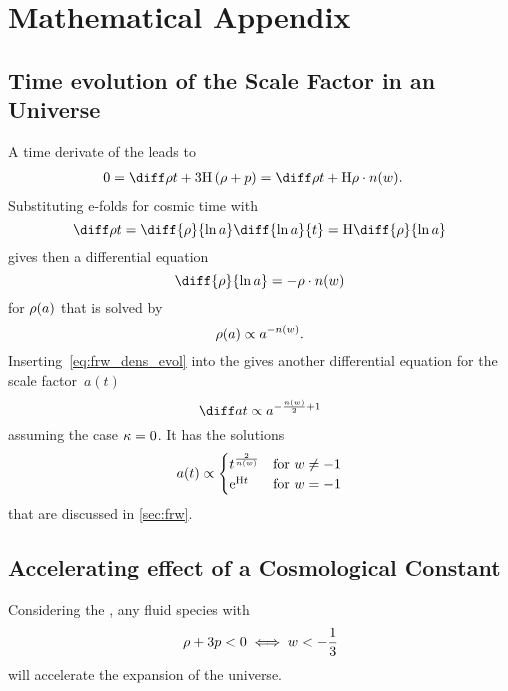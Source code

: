 \chapter{Mathematical Appendix}

\section{Time evolution of the Scale Factor in an \FLRW{} Universe}\label{app:deriv_frw_a_evol}

A time derivate of the  leads to
\begin{align}
	0 &= \dt{\dens} + 3\Hcosm\del{\dens + p} = \dt{\dens} + \Hcosm\dens \cdot \nexp
	\eqpunct{.}
\end{align}
Substituting e-folds for cosmic time with
\begin{equation}
	\dt{\dens} = \diff{\dens}{\efold} \diff{\efold}{t} = \Hcosm \diff{\dens}{\efold}
\end{equation}
gives then a differential equation
\begin{equation}
	\diff{\dens}{\efold} = -\dens \cdot \nexp
\end{equation}
for \(\rho(a)\) that is solved by
\begin{equation}
	\rho(a) \propto a^{-n(w)}
	\mathpunct{.}
\end{equation}
Inserting~\eqref{eq:frw_dens_evol} into the  gives another differential equation for the scale factor~\(a(t)\)
\begin{equation}
	\dt{a} \propto a^{-\frac{\nexp}{2}+1}
\end{equation}
assuming the case \(\kappa=0\). It has the solutions
\begin{equation}
	a(t) \propto
	\begin{cases}
		t^{\frac{2}{n(w)}} &\text{for \(w\neq-1\)} \\
		\mathrm{e}^{\mathrm{H} t} &\text{for \(w=-1\)}
	\end{cases}
\end{equation}
that are discussed in \autoref{sec:frw}.


\section{Accelerating effect of a Cosmological Constant}\label{app:deriv_acc_exp_lambda}

Considering the , any fluid species with
\begin{equation}\label{eq:acc_cond}
	\rho + 3 p < 0 \iff w < -\frac{1}{3}
\end{equation}
will accelerate the expansion of the universe.

